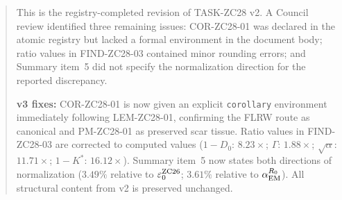 \documentclass[12pt, a4paper]{article}
\begin{document}


\begin{abstract}
\sloppy
This is the registry-completed revision of TASK-ZC28 v2.
A Council review identified three remaining issues: COR-ZC28-01
was declared in the atomic registry but lacked a formal environment
in the document body; ratio values in FIND-ZC28-03 contained
minor rounding errors; and Summary item~5 did not specify
the normalization direction for the reported discrepancy.

\textbf{v3 fixes:} COR-ZC28-01 is now given an explicit
\texttt{corollary} environment immediately following
LEM-ZC28-01, confirming the FLRW route as canonical and
PM-ZC28-01 as preserved scar tissue.
Ratio values in FIND-ZC28-03 are corrected to computed values
($1{-}D_0$: $8.23\times$; $\Gamma$: $1.88\times$;
$\sqrt{\alpha}$: $11.71\times$; $1{-}K^*$: $16.12\times$).
Summary item~5 now states both directions of normalization
($3.49\%$ relative to $\varepsilon_0^{\rm ZC26}$;
$3.61\%$ relative to $\alpha_{\rm EM}^{R_0}$).
All structural content from v2 is preserved unchanged.
\end{abstract}

\tableofcontents
\newpage
\end{document}
